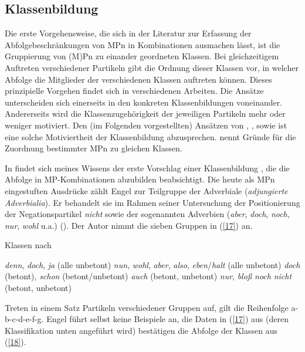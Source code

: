 \subsection{Klassenbildung}
Die erste Vorgehensweise, die sich in der Literatur zur Erfassung der Abfolgebeschränkungen von MPn in Kombinationen ausmachen lässt, ist die Gruppierung von (M)Pn zu einander geordneten Klassen. Bei gleichzeitigem Auf\-treten verschiedener Partikeln gibt die Ordnung dieser Klassen vor, in welcher Abfolge die Mitglieder der verschiedenen Klassen auftreten können. Dieses prin\-zipielle Vorgehen findet sich in verschiedenen Arbeiten. Die Ansätze unterscheiden sich einerseits in den konkreten Klassenbildungen voneinander. Andererseits wird die Klassenzugehörigkeit der jeweiligen Partikeln mehr oder weniger motiviert. Den (im Folgenden vorgestellten) Ansätzen von \citet{Engel1968}, \citet{Helbig1981}, \citet{Helbig1990} sowie \citet{Helbig1999} ist eine solche Motiviertheit der Klassenbildung abzusprechen. \citet{Thurmair1991} nennt Gründe für die Zuordnung bestimmter MPn zu gleichen Klassen. 

In \citet{Engel1968} findet sich meines Wissens der erste Vorschlag einer Klassenbildung , die die Abfolge in MP-Kombinationen abzubilden beabsichtigt. Die heute als MPn eingestuften Ausdrücke zählt Engel zur Teilgruppe der Adverbiale (\textit{adjungierte Adverbialia}). Er behandelt sie im Rahmen seiner Untersuchung der Positionierung der Negationspartikel \textit{nicht} sowie der \glqq sogenannten Adverbien\grqq{} (\textit{aber}, \textit{doch}, \textit{noch}, \textit{nur}, \textit{wohl} u.a.) (\citealt[85]{Engel1968}). Der Autor nimmt die sieben Gruppen in (\ref{17}) an.

\begin{exe}
	\ex\label{17} 
		Klassen nach \citet[91-94]{Engel1968}
	\begin{xlist}	
		\ex\label{17a} \textit{denn}, \textit{doch}, \textit{ja} (alle unbetont)
		\ex\label{17b} \textit{nun}, \textit{wohl}, \textit{aber}, \textit{also}, \textit{eben}/\textit{halt} (alle unbetont)
		\ex\label{17c} \textit{doch} (betont), \textit{schon} (betont/unbetont)
		\ex\label{17d} \textit{auch} (betont, unbetont)
		\ex\label{17e} \textit{nur}, \textit{bloß}
		\ex\label{17f} \textit{noch}
		\ex\label{17f} \textit{nicht} (betont, unbetont)
	\end{xlist}	
\end{exe}
Treten in einem Satz Partikeln verschiedener Gruppen auf, gilt die Reihenfolge a-b-c-d-e-f-g. Engel führt selbst keine Beispiele an, die Daten in (\ref{17}) aus \citet{Helbig1981} (deren Klassifikation unten angeführt wird) bestätigen die Abfolge der Klassen aus (\ref{18}). 

